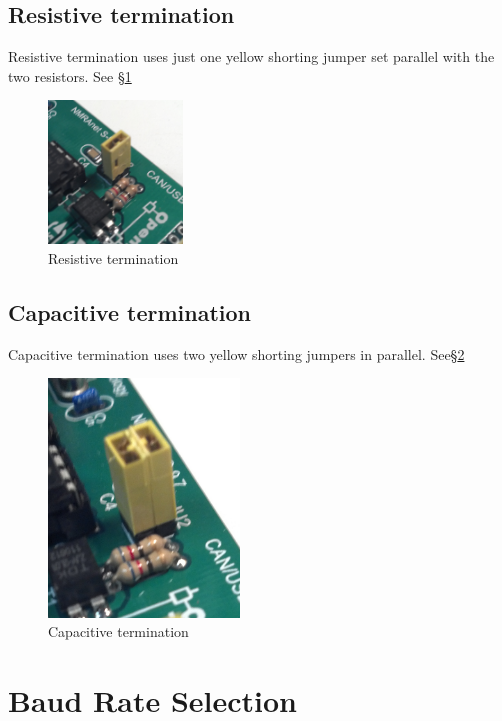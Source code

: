 \documentclass[11pt]{book}
\begin{document}
\subsection{Resistive termination}
Resistive termination uses just one yellow shorting jumper set parallel with the two resistors.  See \S\ref{ResTerm}
\begin{figure}[htbp]
\begin{center}
\includegraphics[height=1.5in]{images/term_resistive.png}
\caption{Resistive termination}
\label{ResTerm}
\end{center}
\end{figure}
\subsection{Capacitive termination}
Capacitive termination uses two yellow shorting jumpers in parallel.  See\S\ref{CapTerm}
\begin{figure}[htbp]
\begin{center}
\includegraphics[width=2in]{images/term_capacitive.png}
\caption{Capacitive termination}
\label{CapTerm}
\end{center}
\end{figure}

\section{Baud Rate Selection}
\end{document}

